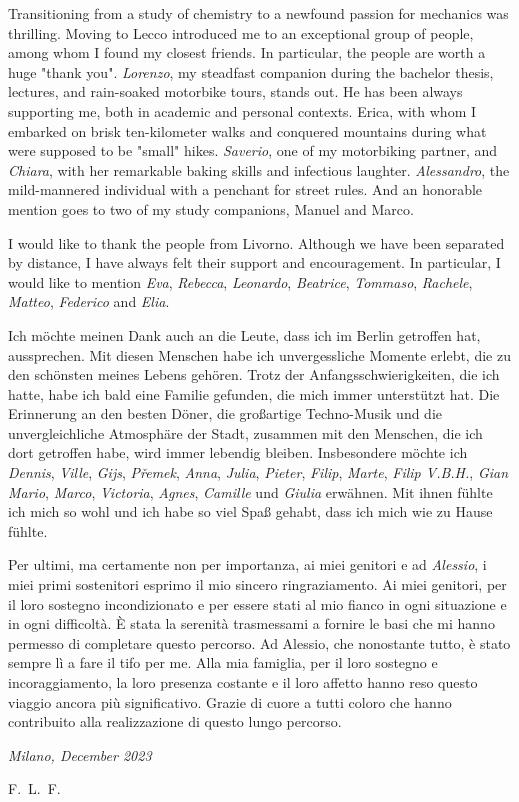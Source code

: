 \documentclass{Configuration_Files/PoliMi3i_thesis}
\begin{document}
Transitioning from a study of chemistry to a newfound passion for mechanics was thrilling. Moving to Lecco introduced me to an exceptional group of people, among whom I found my closest friends. In particular, the people are worth a huge "thank you". \textit{Lorenzo}, my steadfast companion during the bachelor thesis, lectures, and rain-soaked motorbike tours, stands out. He has been always supporting me, both in academic and personal contexts. Erica, with whom I embarked on brisk ten-kilometer walks and conquered mountains during what were supposed to be "small" hikes. \textit{Saverio}, one of my motorbiking partner, and \textit{Chiara}, with her remarkable baking skills and infectious laughter. \textit{Alessandro}, the mild-mannered individual with a penchant for street rules. And an honorable mention goes to two of my study companions, Manuel and Marco.

I would like to thank the people from Livorno. Although we have been separated by distance, I have always felt their support and encouragement. In particular, I would like to mention \textit{Eva}, \textit{Rebecca}, \textit{Leonardo}, \textit{Beatrice}, \textit{Tommaso}, \textit{Rachele}, \textit{Matteo}, \textit{Federico} and \textit{Elia}.

Ich möchte meinen Dank auch an die Leute, dass ich im Berlin getroffen hat, aussprechen. Mit diesen Menschen habe ich unvergessliche Momente erlebt, die zu den schönsten meines Lebens gehören. Trotz der Anfangsschwierigkeiten, die ich hatte, habe ich bald eine Familie gefunden, die mich immer unterstützt hat. Die Erinnerung an den besten Döner, die großartige Techno-Musik und die unvergleichliche Atmosphäre der Stadt, zusammen mit den Menschen, die ich dort getroffen habe, wird immer lebendig bleiben. Insbesondere möchte ich \textit{Dennis}, \textit{Ville}, \textit{Gijs}, \textit{P\v{r}emek}, \textit{Anna}, \textit{Julia}, \textit{Pieter}, \textit{Filip}, \textit{Marte}, \textit{Filip V.B.H.}, \textit{Gian Mario}, \textit{Marco}, \textit{Victoria}, \textit{Agnes}, \textit{Camille} und \textit{Giulia} erwähnen. Mit ihnen fühlte ich mich so wohl und ich habe so viel Spaß gehabt, dass ich mich wie zu Hause fühlte.

Per ultimi, ma certamente non per importanza, ai miei genitori e ad \textit{Alessio}, i miei primi sostenitori esprimo il mio sincero ringraziamento. Ai miei genitori, per il loro sostegno incondizionato e per essere stati al mio fianco in ogni situazione e in ogni difficoltà. È stata la serenità trasmessami a fornire le basi che mi hanno permesso di completare questo percorso. Ad Alessio, che nonostante tutto, è stato sempre lì a fare il tifo per me. Alla mia famiglia, per il loro sostegno e incoraggiamento, la loro presenza costante e il loro affetto hanno reso questo viaggio ancora più significativo. Grazie di cuore a tutti coloro che hanno contribuito alla realizzazione di questo lungo percorso.

\noindent\textit{Milano, December 2023}

\begin{flushright}
    \hfill F.~L.~F.
\end{flushright}

\cleardoublepage
\end{document}

